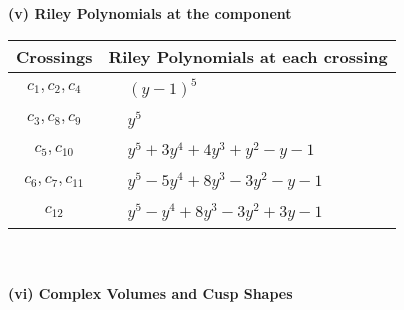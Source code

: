 \documentclass[1p]{elsarticle_modified}
\theoremstyle{definition}
\begin{document}
\newpage\renewcommand{\arraystretch}{1}
\flushleft \textbf{(v) Riley Polynomials at the component}\newline \\
\begin{tabular}{m{50pt}|m{274pt}}
Crossings & \hspace{64pt}Riley Polynomials at each crossing \\
\hline $$\begin{aligned}c_{1},c_{2},c_{4}\end{aligned}$$&$\begin{aligned}
&(y-1)^5
\end{aligned}$\\
\hline $$\begin{aligned}c_{3},c_{8},c_{9}\end{aligned}$$&$\begin{aligned}
&y^5
\end{aligned}$\\
\hline $$\begin{aligned}c_{5},c_{10}\end{aligned}$$&$\begin{aligned}
&y^5+3 y^4+4 y^3+y^2- y-1
\end{aligned}$\\
\hline $$\begin{aligned}c_{6},c_{7},c_{11}\end{aligned}$$&$\begin{aligned}
&y^5-5 y^4+8 y^3-3 y^2- y-1
\end{aligned}$\\
\hline $$\begin{aligned}c_{12}\end{aligned}$$&$\begin{aligned}
&y^5- y^4+8 y^3-3 y^2+3 y-1
\end{aligned}$\\
\hline
\end{tabular}\\~\\
\newpage\flushleft \textbf{(vi) Complex Volumes and Cusp Shapes}
\end{document}
